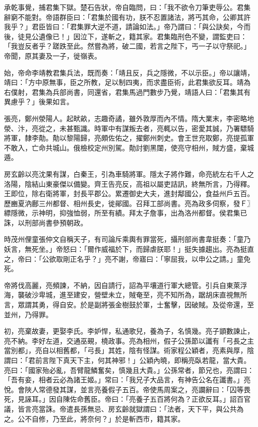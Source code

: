 \begin{pinyinscope}
 承乾事覺，捕君集下獄。楚石告狀，帝自臨問，曰：「我不欲令刀筆吏辱公。君集辭窮不能對。帝語群臣曰：「君集於國有功，朕不忍置諸法，將丐其命，公卿其許我乎？」君臣皆曰：「君集罪大逆不道，請論如法。」帝乃謂曰：「與公訣矣，今而後，徒見公遺像已！」因泣下，遂斬之，籍其家。君集臨刑色不變，謂監吏曰：「我豈反者乎？蹉跌至此。然嘗為將，破二國，若言之陛下，丐一子以守祭祀。」帝聞，原其妻及一子，徙嶺表。



 始，帝命李靖教君集兵法，既而奏：「靖且反，兵之隱微，不以示臣。」帝以讓靖，靖曰：「方中原無事，臣之所教，足以制四夷，而求盡臣術，此君集欲反耳。靖為右僕射，君集為兵部尚書，同還省，君集馬過門數步乃覺，靖語人曰：「君集其有異慮乎？」後果如言。



 張亮，鄭州滎陽人。起畎畝，志趣奇譎，雖外敦厚而內不情。隋大業末，李密略地滎、汴，亮從之，未甚甄識。時軍中有謀叛去者，亮輒以告，密愛其誠，乃署驃騎將軍，隸李勣。勣以黎陽歸，亮頗佐佑之，擢鄭州刺史。會王世充取鄭，亮提孤軍不敢入，亡命共城山。俄檢校定州別駕。勣討劉黑闥，使亮守相州，賊方盛，棄城遁。



 房玄齡以亮沈果有謀，白秦王，引為車騎將軍。隱太子將作難，命亮統左右千人之洛陽，陰結山東豪傑以備變。齊王告亮反，高祖以屬吏詰訊，終無所言，乃得釋。王即位，除右衛將軍，封長平郡公。累遷御史大夫，進封鄅國公，食益州戶五百。歷豳夏汭鄜三州都督、相州長史，徙鄖國。召拜工部尚書。亮為政多伺察，發Ｆ〗縹隱微，示神明，抑強恤弱，所至有績。拜太子詹事，出為洛州都督。侯君集已誅，以刑部尚書參預朝政。



 時茂州俚童張仲文自稱天子，有司論斥乘輿有罪當死，攝刑部尚書韋挺奏：「童乃妖言，無死坐。」帝怒曰：「爾作威福於下，而歸虐朕耶！」挺失據趨出。亮為挺直之，帝曰：「公欲取剛正名乎？」亮不謝，帝寤曰：「寧屈我，以申公之請。」童免死。



 帝將伐高麗，亮頻諫，不納，因自請行，詔為平壤道行軍大總管。引兵自東萊浮海，襲破沙卑城，進至建安，營壁未立，賊奄至，亮不知所為，踞胡床直視無所言，眾謂其勇，得自安。於是副將張金樹鼓於軍，士奮擊，因破賊。及從帝還，至並州，乃得罪。



 初，亮棄故妻，更娶李氏。李妒悍，私通歌兒，養為子，名慎幾。亮子顗數諫止，亮不納。李好左道，交通巫覡，橈政事。亮為相州，假子公孫節以讖有「弓長之主當別都」，亮自以相舊都，「弓長」其姓，陰有怪謀。術家程公穎者，亮素與厚，陰謂曰：「君前言陛下真天下主，何其神邪！」公穎內曉，即稱亮臥若龍，當大貴。亮曰：「國家殆必亂，吾臂龍鱗奮矣，慎幾且大貴。」公孫常者，節兄也，亮謂曰：「吾有妾，相者云必為諸王姬。」常曰：「我兄子大品言，有神告公名在讖書。」亮悅。會陜人常德發其謀，並言亮養假子五百。帝使馬周案之，亮讕辭曰：「囚等畏死，見誣耳。」因自陳佐命舊臣。帝曰：「亮養子五百將何為？正欲反耳。」詔百官議，皆言亮當誅。帝遣長孫無忌、房玄齡就獄謂曰：「法者，天下平，與公共為之。公不自修，乃至此，將奈何？」於是斬西市，籍其家。




\end{pinyinscope}

